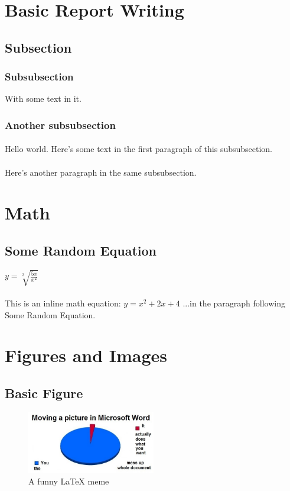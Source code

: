 \documentclass{article}
\begin{document}
\tableofcontents


\section{Basic Report Writing}
\subsection{Subsection}
\subsubsection{Subsubsection}
With some text in it.
\subsubsection{Another subsubsection}
\paragraph{}
Hello world. Here's some text in the first paragraph of this subsubsection.
\paragraph{}
Here's another paragraph in the same subsubsection. 


\section{Math}
\subsection{Some Random Equation}
$y = \sqrt[3]{\frac{5x}{x^2}}$

\paragraph{}
This is an inline math equation: $y = x^2 + 2x + 4$ ...in the paragraph following Some Random Equation.


\section{Figures and Images}
\subsection{Basic Figure}
\begin{figure}[h]
\caption{A funny LaTeX meme}
\centering
\includegraphics[width=0.5\textwidth]{latex-meme.jpg}
\end{figure}
\end{document}
